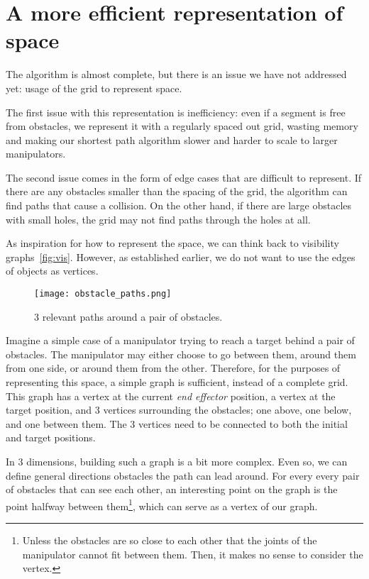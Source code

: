 \clearpage

\section{A more efficient representation of space}

The algorithm is almost complete, but there is an issue we have not addressed yet: usage of the grid to represent space.

The first issue with this representation is inefficiency: even if a segment is free from obstacles, we represent it with a regularly spaced out grid, wasting memory and making our shortest path algorithm slower and harder to scale to larger manipulators.

The second issue comes in the form of edge cases that are difficult to represent. If there are any obstacles smaller than the spacing of the grid, the algorithm can find paths that cause a collision. On the other hand, if there are large obstacles with small holes, the grid may not find paths through the holes at all.

As inspiration for how to represent the space, we can think back to visibility graphs~\ref{fig:vis}. However, as established earlier, we do not want to use the edges of objects as vertices.

\begin{wrapfigure}{r}{0.4\textwidth}
  \centering
  \texttt{[image: obstacle\_paths.png]}
  \caption{3 relevant paths around a pair of obstacles.}
\end{wrapfigure}

Imagine a simple case of a manipulator trying to reach a target behind a pair of obstacles. The manipulator may either choose to go between them, around them from one side, or around them from the other. Therefore, for the purposes of representing this space, a simple graph is sufficient, instead of a complete grid. This graph has a vertex at the current \textit{end effector} position, a vertex at the target position, and 3 vertices surrounding the obstacles; one above, one below, and one between them. The 3 vertices need to be connected to both the initial and target positions.

In 3 dimensions, building such a graph is a bit more complex. Even so, we can define general directions obstacles the path can lead around. For every every pair of obstacles that can see each other, an interesting point on the graph is the point halfway between them\footnote{Unless the obstacles are so close to each other that the joints of the manipulator cannot fit between them. Then, it makes no sense to consider the vertex.}, which can serve as a vertex of our graph.


